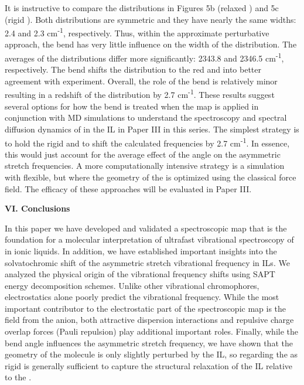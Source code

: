 \documentclass[]{article}
\begin{document}
It is instructive to compare the distributions in Figures 5b (relaxed ) and 5c (rigid ). Both distributions are symmetric and they have nearly the same widths: 2.4 and 2.3 cm\textsuperscript{-1}, respectively. Thus, within the approximate perturbative approach, the bend has very little influence on the width of the distribution. The averages of the distributions differ more significantly: 2343.8 and 2346.5 cm\textsuperscript{-1}, respectively. The bend shifts the distribution to the red and into better agreement with experiment. Overall, the role of the bend is relatively minor resulting in a redshift of the distribution by 2.7 cm\textsuperscript{-1}. These results suggest several options for how the bend is treated when the map is applied in conjunction with MD simulations to understand the spectroscopy and spectral diffusion dynamics of  in the \ce{[C4C1im][PF6]} IL in Paper III in this series. The simplest strategy is to hold the  rigid and to shift the calculated frequencies by 2.7 cm\textsuperscript{-1}. In essence, this would just account for the average effect of the  angle on the asymmetric stretch frequencies. A more computationally intensive strategy is a simulation with  flexible, but where the geometry of the  is optimized using the classical force field.  The efficacy of these approaches will be evaluated in Paper III.

\textbf{VI. Conclusions}

In this paper we have developed and validated a spectroscopic map that is the foundation for a molecular interpretation of ultrafast vibrational spectroscopy of  in ionic liquids. In addition, we have established important insights into the solvatochromic shift of the  asymmetric stretch vibrational frequency in ILs. We analyzed the physical origin of the vibrational frequency shifts using SAPT energy decomposition schemes. Unlike other vibrational chromophores, electrostatics alone poorly predict the vibrational frequency. While the most important contributor to the electrostatic part of the spectroscopic map is the field from the anion, both attractive dispersion interactions and repulsive charge overlap forces (Pauli repulsion) play additional important roles. Finally, while the  bend angle influences the asymmetric stretch frequency, we have shown that the geometry of the  molecule is only slightly perturbed by the IL, so regarding the  as rigid is generally sufficient to capture the structural relaxation of the IL relative to the .
\end{document}
